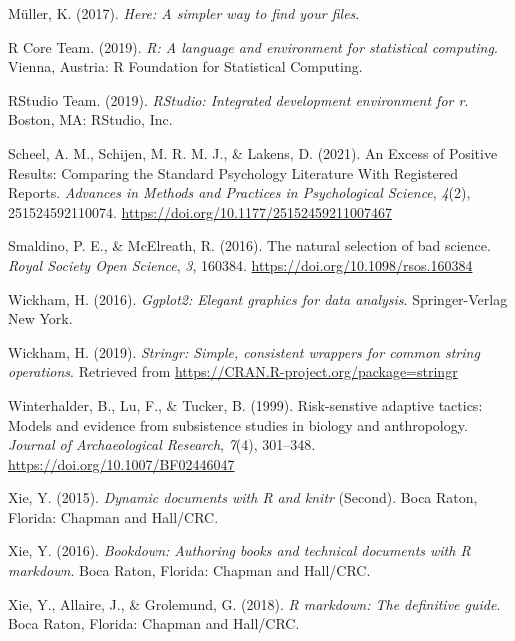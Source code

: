 \documentclass[british,,man,floatsintext]{apa6}
\begin{document}
\leavevmode\hypertarget{ref-R-here}{}%
Müller, K. (2017). \emph{Here: A simpler way to find your files}.

\leavevmode\hypertarget{ref-R-base}{}%
R Core Team. (2019). \emph{R: A language and environment for statistical computing}. Vienna, Austria: R Foundation for Statistical Computing.

\leavevmode\hypertarget{ref-RStudioTeam2019}{}%
RStudio Team. (2019). \emph{RStudio: Integrated development environment for r}. Boston, MA: RStudio, Inc.

\leavevmode\hypertarget{ref-Scheel2021}{}%
Scheel, A. M., Schijen, M. R. M. J., \& Lakens, D. (2021). An Excess of Positive Results: Comparing the Standard Psychology Literature With Registered Reports. \emph{Advances in Methods and Practices in Psychological Science}, \emph{4}(2), 251524592110074. \url{https://doi.org/10.1177/25152459211007467}

\leavevmode\hypertarget{ref-Smaldino2016}{}%
Smaldino, P. E., \& McElreath, R. (2016). The natural selection of bad science. \emph{Royal Society Open Science}, \emph{3}, 160384. \url{https://doi.org/10.1098/rsos.160384}

\leavevmode\hypertarget{ref-R-ggplot2}{}%
Wickham, H. (2016). \emph{Ggplot2: Elegant graphics for data analysis}. Springer-Verlag New York.

\leavevmode\hypertarget{ref-R-stringr}{}%
Wickham, H. (2019). \emph{Stringr: Simple, consistent wrappers for common string operations}. Retrieved from \url{https://CRAN.R-project.org/package=stringr}

\leavevmode\hypertarget{ref-Winterhalder1999}{}%
Winterhalder, B., Lu, F., \& Tucker, B. (1999). Risk-senstive adaptive tactics: Models and evidence from subsistence studies in biology and anthropology. \emph{Journal of Archaeological Research}, \emph{7}(4), 301--348. \url{https://doi.org/10.1007/BF02446047}

\leavevmode\hypertarget{ref-R-knitr}{}%
Xie, Y. (2015). \emph{Dynamic documents with R and knitr} (Second). Boca Raton, Florida: Chapman and Hall/CRC.

\leavevmode\hypertarget{ref-R-bookdown}{}%
Xie, Y. (2016). \emph{Bookdown: Authoring books and technical documents with R markdown}. Boca Raton, Florida: Chapman and Hall/CRC.

\leavevmode\hypertarget{ref-R-rmarkdown}{}%
Xie, Y., Allaire, J., \& Grolemund, G. (2018). \emph{R markdown: The definitive guide}. Boca Raton, Florida: Chapman and Hall/CRC.
\end{document}
